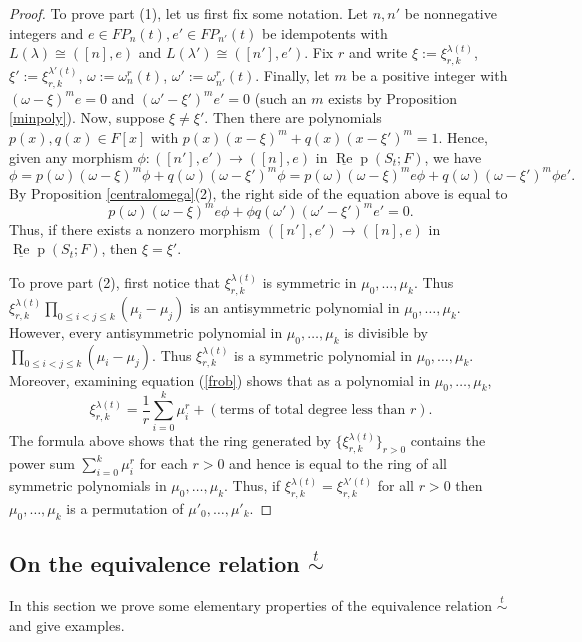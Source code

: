 \documentclass{amsart}
\theoremstyle{definition}
\def\uRep{\underline{\operatorname{Re}}\!\operatorname{p}}
\renewcommand{\1}{_{(1)}}
\renewcommand{\2}{_{(2)}}
\newcommand{\3}{_{(3)}}
\newcommand{\4}{_{(4)}}
\begin{document}
\begin{proof} To prove part (1), let us first fix some notation.  Let $n, n'$ be nonnegative integers and $e\in FP_n(t), e'\in FP_{n'}(t)$ be idempotents with $L(\lambda)\cong([n], e)$ and $L(\lambda')\cong([n'], e')$.  Fix $r$ and write $\xi:=\xi^{\lambda(t)}_{r, k}$, $\xi':=\xi^{\lambda'(t)}_{r, k}$, $\omega:=\omega_n^r(t)$, $\omega':=\omega_{n'}^r(t)$.  Finally, let $m$ be a positive integer with $(\omega-\xi)^me=0$ and $(\omega'-\xi')^me'=0$ (such an $m$ exists by Proposition \ref{minpoly}).  Now, suppose $\xi\not=\xi'$.  Then there are polynomials $p(x), q(x)\in F[x]$ with $p(x)(x-\xi)^m+q(x)(x-\xi')^m=1$.  Hence, given any morphism $\phi:([n'], e')\to([n], e)$ in $\uRep(S_t; F)$, we have $$\phi=p(\omega)(\omega-\xi)^m\phi+q(\omega)(\omega-\xi')^m\phi=p(\omega)(\omega-\xi)^me\phi+q(\omega)(\omega-\xi')^m\phi e'.$$  By  Proposition \ref{centralomega}(2), the right side of the equation above is equal to $$p(\omega)(\omega-\xi)^me\phi+\phi q(\omega')(\omega'-\xi')^m e'=0.$$  Thus, if there exists a nonzero morphism $([n'], e')\to([n], e)$ in $\uRep(S_t; F)$, then $\xi=\xi'$.

To prove part (2), first notice that $\xi^{\lambda(t)}_{r, k}$ is symmetric in $\mu_0,\ldots, \mu_k$.  Thus $\xi^{\lambda(t)}_{r, k}\prod_{0\leq i<j\leq k}(\mu_i-\mu_j)$ is an antisymmetric polynomial in $\mu_0,\ldots, \mu_k$.  However, every antisymmetric polynomial in $\mu_0,\ldots, \mu_k$ is divisible by $\prod_{0\leq i<j\leq k}(\mu_i-\mu_j)$.  Thus $\xi^{\lambda(t)}_{r, k}$ is a symmetric polynomial in $\mu_0,\ldots, \mu_k$.  
Moreover, examining equation (\ref{frob}) shows that as a polynomial in $\mu_0,\ldots, \mu_k$, $$\xi^{\lambda(t)}_{r, k}=\frac{1}{r}\sum_{i=0}^k\mu_i^r+\left(\text{terms of total degree less than }r\right).$$  The formula above shows that the ring generated by $\{\xi_{r,k}^{\lambda(t)}\}_{r>0}$ contains the power sum $\sum_{i=0}^k\mu_i^r$ for each $r>0$ and hence is equal to the ring of all symmetric polynomials in $\mu_0,\ldots, \mu_k$.  Thus, if $\xi^{\lambda(t)}_{r, k}=\xi^{\lambda'(t)}_{r, k}$ for all $r>0$ then $\mu_0,\ldots, \mu_k$ is a permutation of $\mu'_0,\ldots, \mu'_k$.
\end{proof}






\subsection{On the equivalence relation $\stackrel{t}{\sim}$}  In this section we prove some elementary properties of the equivalence relation $\stackrel{t}{\sim}$ and give examples.  
\end{document}

